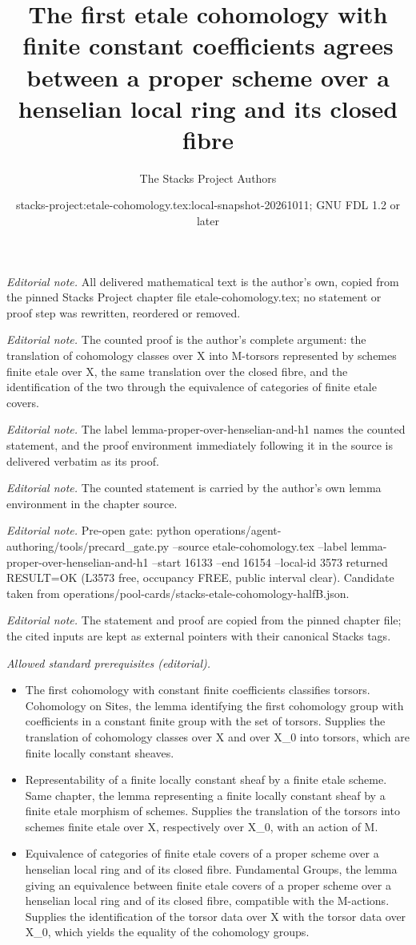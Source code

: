 \documentclass[10pt,a4paper]{amsart}
\title{The first etale cohomology with finite constant coefficients agrees between a proper scheme over a henselian local ring and its closed fibre}
\author{The Stacks Project Authors}
\date{stacks-project:etale-cohomology.tex:local-snapshot-20261011; GNU FDL 1.2 or later}
\theoremstyle{plain}
\theoremstyle{definition}
\theoremstyle{remark}
\numberwithin{equation}{subsection}
\begin{document}
\maketitle
\noindent\textit{Editorial note.} All delivered mathematical text is the author's own, copied from the pinned Stacks Project chapter file etale-cohomology.tex; no statement or proof step was rewritten, reordered or removed.\par\medskip
\noindent\textit{Editorial note.} The counted proof is the author's complete argument: the translation of cohomology classes over X into M-torsors represented by schemes finite etale over X, the same translation over the closed fibre, and the identification of the two through the equivalence of categories of finite etale covers.\par\medskip
\noindent\textit{Editorial note.} The label lemma-proper-over-henselian-and-h1 names the counted statement, and the proof environment immediately following it in the source is delivered verbatim as its proof.\par\medskip
\noindent\textit{Editorial note.} The counted statement is carried by the author's own lemma environment in the chapter source.\par\medskip
\noindent\textit{Editorial note.} Pre-open gate: python operations/agent-authoring/tools/precard\_gate.py --source etale-cohomology.tex --label lemma-proper-over-henselian-and-h1 --start 16133 --end 16154 --local-id 3573 returned RESULT=OK (L3573 free, occupancy FREE, public interval clear). Candidate taken from operations/pool-cards/stacks-etale-cohomology-halfB.json.\par\medskip
\noindent\textit{Editorial note.} The statement and proof are copied from the pinned chapter file; the cited inputs are kept as external pointers with their canonical Stacks tags.\par\medskip
\noindent\textit{Allowed standard prerequisites (editorial).}\begin{itemize}
\item The first cohomology with constant finite coefficients classifies torsors. Cohomology on Sites, the lemma identifying the first cohomology group with coefficients in a constant finite group with the set of torsors. Supplies the translation of cohomology classes over X and over X\_0 into torsors, which are finite locally constant sheaves.
\item Representability of a finite locally constant sheaf by a finite etale scheme. Same chapter, the lemma representing a finite locally constant sheaf by a finite etale morphism of schemes. Supplies the translation of the torsors into schemes finite etale over X, respectively over X\_0, with an action of M.
\item Equivalence of categories of finite etale covers of a proper scheme over a henselian local ring and of its closed fibre. Fundamental Groups, the lemma giving an equivalence between finite etale covers of a proper scheme over a henselian local ring and of its closed fibre, compatible with the M-actions. Supplies the identification of the torsor data over X with the torsor data over X\_0, which yields the equality of the cohomology groups.
\end{itemize}\medskip
\end{document}
